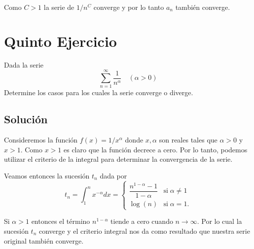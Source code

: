 \documentclass[fleqn,leqno,11pt,letterpaper,final]{article}
\begin{document}
Como $C>1$ la serie de $1/n^C$ converge y por lo tanto $a_n$ también converge.

\section{Quinto Ejercicio}%
\label{sec:Quinto Ejercicio}
Dada la serie
\[
	\sum_{n=1}^{\infty} \frac{1}{n^{\alpha}}\quad (\alpha>0)
\]
Determine los casos para los cuales la serie converge o diverge.

\subsection{Solución}
Consideremos la función $f(x)=1/x^{\alpha}$ donde $x,\alpha$ son reales tales que $\alpha>0$
y $x>1$. Como $x>1$ es claro que la función decrece a cero. Por lo tanto, podemos
utilizar el criterio de la integral para determinar la convergencia de la serie.

Veamos entonces la sucesión $t_n$ dada por
\[
	t_n=\int_1^n x^{-\alpha} dx=
	\begin{cases}
		\dfrac{n^{1-\alpha}-1}{1-\alpha} &\text{si}\;\alpha\neq1\\
		\log(n) &\text{si}\;\alpha=1.
	\end{cases}
\]

Si $\alpha>1$ entonces el término $n^{1-\alpha}$ tiende a cero cuando $n\to\infty$.
Por lo cual la sucesión $t_n$ converge y el criterio integral nos
da como resultado que nuestra serie original también converge.
\end{document}
